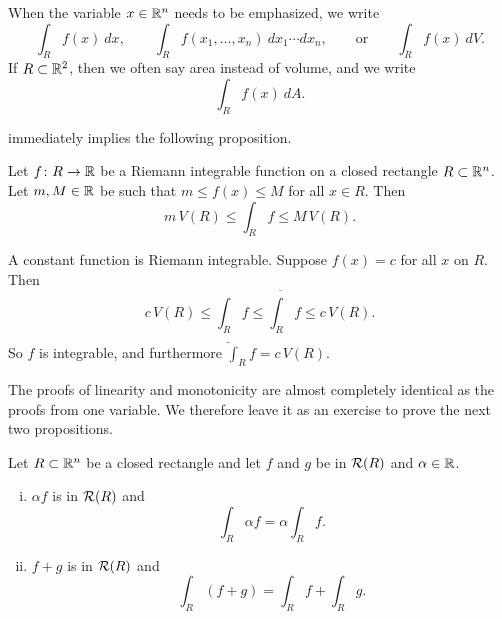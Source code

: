When the variable $x \in {\mathbb{R}}^n$ needs to be emphasized, we write
\begin{equation*}
\int_R f(x)~dx,
\qquad
\int_R f(x_1,\ldots,x_n)~dx_1 \cdots dx_n,
\qquad
\text{or}
\qquad
\int_R f(x)~dV .
\end{equation*}
If $R \subset {\mathbb{R}}^2$, then we often say area instead of volume, and we
write
\begin{equation*}
\int_R f(x)~dA .
\end{equation*}

 immediately implies the following
proposition.

\begin{prop} \label{mv:intbound:prop}
Let $f \colon R \to {\mathbb{R}}$ be a Riemann integrable function
on a closed rectangle $R \subset {\mathbb{R}}^n$.
Let $m, M \in {\mathbb{R}}$ be 
such that $m \leq f(x) \leq M$ for all $x \in R$.  Then
\begin{equation*}
m \, V(R) \leq
\int_{R} f
\leq M \, V(R) .
\end{equation*}
\end{prop}

\begin{example}
A constant function is Riemann integrable.  Suppose
$f(x) = c$ for all $x$ on $R$.  Then
\begin{equation*}
c \, V(R) \leq \underline{\int_R} f \leq \overline{\int_R} f \leq c\, V(R) .
\end{equation*}
So $f$ is integrable, and furthermore $\int_R f = c\,V(R)$.
\end{example}

The proofs of linearity and monotonicity are almost completely identical as
the proofs from one variable.  We therefore leave it as an exercise to prove
the next two propositions.

\begin{samepage}
\begin{prop}[Linearity] \label{mv:intlinearity:prop}
Let $R \subset {\mathbb{R}}^n$ be a closed rectangle and let
$f$ and $g$ be in ${\mathcal{R}}(R)$ and $\alpha \in {\mathbb{R}}$.
\begin{enumerate}[(i)]
\item $\alpha f$ is in ${\mathcal{R}}(R)$ and
\begin{equation*}
\int_R \alpha f = \alpha \int_R f .
\end{equation*}
\item $f+g$ is in ${\mathcal{R}}(R)$ and
\begin{equation*}
\int_R (f+g) = 
\int_R f
+
\int_R g .
\end{equation*}
\end{enumerate}
\end{prop}
\end{samepage}

